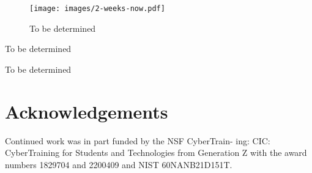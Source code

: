 \documentclass[11pt,twocolumn]{article}
\begin{document}
\begin{figure}[htb]
\centering\texttt{[image: images/2-weeks-now.pdf]}
\caption{To be determined}
\label{fig:tbd}
\end{figure}

\begin{table}[htb]

\caption{To be determined}
\label{tab:tbd}
\bigskip
\centering%
\end{table}

\begin{table}[htb]

\caption{To be determined}
\label{tab:tbdetermined}
\bigskip
\centering%
\end{table}

\section*{Acknowledgements}

Continued work was in part funded by the NSF CyberTrain-
ing: CIC: CyberTraining for Students and Technologies from
Generation Z with the award numbers 1829704 and 2200409
and NIST 60NANB21D151T.




\end{document}
